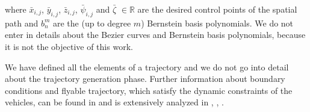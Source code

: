 where $\bar{x}_{i,j}$, $\bar{y}_{i,j}$, $\bar{z}_{i,j}$, $\bar{\psi}_{i,j}$ and $\bar{\zeta}$ $\in \mathbb{R}$
are the desired control points of the spatial path and $b_n^m$ are the (up to degree $m$)
Bernstein basis polynomials.
We do not enter in details about the Bezier curves and Bernstein basis polynomials,
because it is not the objective of this work.

We have defined all the elements of a trajectory and we do not go into detail
about the trajectory generation phase.
Further information about boundary conditions and flyable trajectory, which satisfy
the dynamic constraints of the vehicles, can be found in \cite{cichellaMain} and
is extensively analyzed in \cite{trajGeneration1}, \cite{trajGeneration2},
\cite{trajGeneration3}.
